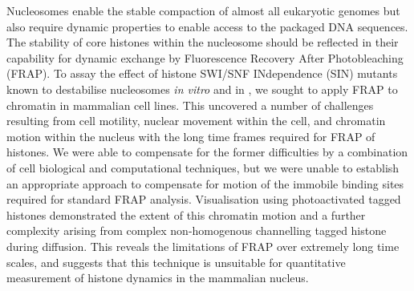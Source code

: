 
  \begin{chapterabstract}
    Nucleosomes enable the stable compaction of almost all eukaryotic
    genomes but also require dynamic properties to enable access to
    the packaged DNA sequences.  The stability of core histones within the
    nucleosome should be reflected in their capability for dynamic exchange by
    Fluorescence Recovery After Photobleaching (FRAP).  To assay the
    effect of histone SWI/SNF INdependence (SIN)
    mutants known to destabilise nucleosomes
    \textit{in vitro} and in , we sought to
    apply FRAP to chromatin in mammalian cell lines.  This uncovered a
    number of challenges resulting from cell motility, nuclear movement
    within the cell, and chromatin motion within the nucleus with the
    long time frames required for FRAP of histones.  We were able to
    compensate for the former difficulties by a combination of cell
    biological and computational techniques, but we were unable to
    establish an appropriate approach to compensate for motion of the immobile
    binding sites required for standard FRAP analysis.
    Visualisation using photoactivated tagged histones
    demonstrated the extent of this chromatin motion
    and a further complexity arising from complex
    non-homogenous channelling tagged histone
    during diffusion.  This reveals the
    limitations of FRAP over extremely long time scales, and suggests
    that this technique is unsuitable for quantitative measurement of
    histone dynamics in the mammalian nucleus.
  \end{chapterabstract}

  
  
  
  
